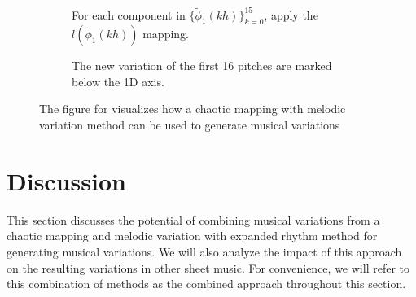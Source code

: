 \documentclass[11pt]{article}
\theoremstyle{definition}
\begin{document}
\begin{figure}
\begin{subfigure}{\textwidth}
{}
  \caption{For each component in $\{\tilde{\phi}_1(kh)\}_{k=0}^{15}$, apply the $l(\tilde{\phi}_1(kh))$ mapping.}
  \label{subfig2:traj2nmp}

\end{subfigure}

\vspace{5pt}

\begin{subfigure}{\textwidth}
  \centering
  \small{
  }
  \caption{The new variation of the first 16 pitches are marked below the 1D axis.}
  \label{subfig2:nmp}

\end{subfigure}

\caption{The figure for visualizes how a chaotic mapping with melodic variation method can be used to generate musical variations}
\label{fig2:dabbymv method}
\end{figure}

\section{Discussion}
\label{sec: discussion}
This section discusses the potential of combining musical variations from a chaotic mapping and melodic variation with expanded rhythm method for generating musical variations. We will also analyze the impact of this approach on the resulting variations in other sheet music. For convenience, we will refer to this combination of methods as the combined approach throughout this section. 
\end{document}
